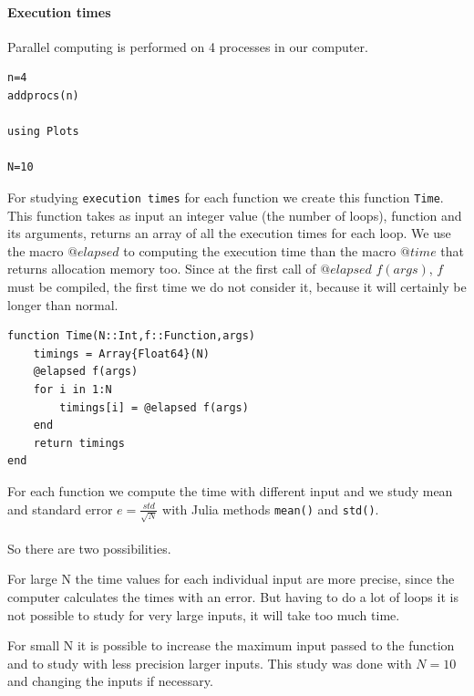 \documentclass{article}
\begin{document}
\paragraph{Execution times\\}
Parallel computing is performed on 4 processes in our computer. 

\begin{flushleft}\small
\begin{list}{}{} \item
   \begin{Verbatim}[tabsize=4]
n=4
addprocs(n)

using Plots

N=10
   \end{Verbatim}
\end{list}
\end{flushleft}
\vspace{2ex}
For studying \texttt{execution times} for each function we create this function \texttt{Time}.
This function takes as input an integer value (the number of loops), function and its arguments, returns an array of all the execution times for each loop. 
We use the macro $@elapsed$ to computing the execution time than the macro $@time$ that returns allocation memory too.  
Since at the first call of $@elapsed$ $f(args)$, $f$ must be compiled, the first time we do not consider it, because it will certainly be longer than normal.

\begin{list}{}{} \item
   \begin{Verbatim}[tabsize=4]
function Time(N::Int,f::Function,args)
	timings = Array{Float64}(N)
	@elapsed f(args)
	for i in 1:N
		timings[i] = @elapsed f(args)
	end
	return timings
end
   \end{Verbatim}
\end{list}
\vspace{2ex}
For each function we compute the time with different input and we study mean and standard error $ e=\frac{std}{\sqrt{N}}$ with Julia methods \texttt{mean()} and \texttt{std()}.
\\
\\
So there are two possibilities.

For large N the time values for each individual input are more precise, since the computer calculates the times with an error. But having to do a lot of loops it is not possible to study for very large inputs, it will take too much time.

For small N it is possible to increase the maximum input passed to the function and to study with less precision larger inputs.
This study was done with $N = 10$ and changing the inputs if necessary.
\vspace{2ex}
\end{document}

